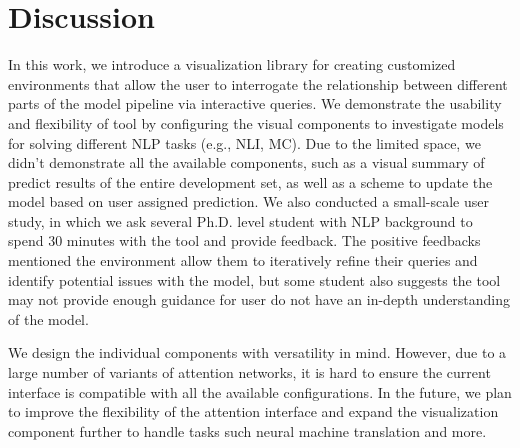 \section{Discussion}
In this work, we introduce a visualization library for creating customized environments that allow the user to interrogate the relationship between different parts of the model pipeline via interactive queries.
%
We demonstrate the usability and flexibility of tool by configuring the visual components to investigate models for solving different NLP tasks (e.g., NLI, MC).
%
Due to the limited space, we didn't demonstrate all the available components, such as a visual summary of predict results of the entire development set, as well as a scheme to update the model based on user assigned prediction. 
%
We also conducted a small-scale user study, in which we ask several Ph.D. level student with NLP background to spend 30 minutes with the tool and provide feedback. The positive feedbacks mentioned the environment allow them to iteratively refine their queries and identify potential issues with the model, but some student also suggests the tool may not provide enough guidance for user do not have an in-depth understanding of the model.

We design the individual components with versatility in mind. However, due to a large number of variants of attention networks, it is hard to ensure the current interface is compatible with all the available configurations.
%
In the future, we plan to improve the flexibility of the attention interface and expand the visualization component further to handle tasks such neural machine translation and more. 
